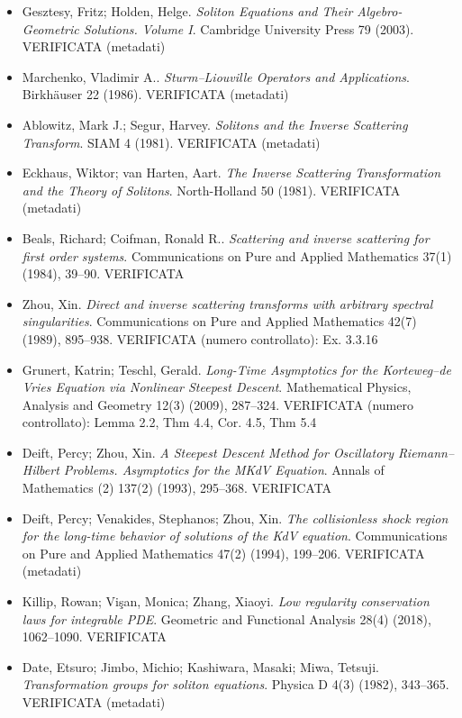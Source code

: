 \documentclass[11pt]{article}
\theoremstyle{plain}
\theoremstyle{definition}
\theoremstyle{remark}
\begin{document}
\begin{itemize}[itemsep=2pt,leftmargin=1.2em,font=\small]
\item Gesztesy, Fritz; Holden, Helge. \emph{Soliton Equations and Their Algebro-Geometric Solutions. Volume {I}}. Cambridge University Press 79 (2003). \textsf{\footnotesize VERIFICATA (metadati)}
\item Marchenko, Vladimir A.. \emph{Sturm--{L}iouville Operators and Applications}. Birkh{\"a}user 22 (1986). \textsf{\footnotesize VERIFICATA (metadati)}
\item Ablowitz, Mark J.; Segur, Harvey. \emph{Solitons and the Inverse Scattering Transform}. SIAM 4 (1981). \textsf{\footnotesize VERIFICATA (metadati)}
\item Eckhaus, Wiktor; van Harten, Aart. \emph{The Inverse Scattering Transformation and the Theory of Solitons}. North-Holland 50 (1981). \textsf{\footnotesize VERIFICATA (metadati)}
\item Beals, Richard; Coifman, Ronald R.. \emph{Scattering and inverse scattering for first order systems}. Communications on Pure and Applied Mathematics 37(1) (1984), 39--90. \textsf{\footnotesize VERIFICATA}
\item Zhou, Xin. \emph{Direct and inverse scattering transforms with arbitrary spectral singularities}. Communications on Pure and Applied Mathematics 42(7) (1989), 895--938. \textsf{\footnotesize VERIFICATA (numero controllato): Ex. 3.3.16}
\item Grunert, Katrin; Teschl, Gerald. \emph{Long-Time Asymptotics for the {K}orteweg--de {V}ries Equation via Nonlinear Steepest Descent}. Mathematical Physics, Analysis and Geometry 12(3) (2009), 287--324. \textsf{\footnotesize VERIFICATA (numero controllato): Lemma 2.2, Thm 4.4, Cor. 4.5, Thm 5.4}
\item Deift, Percy; Zhou, Xin. \emph{A Steepest Descent Method for Oscillatory {R}iemann--{H}ilbert Problems. {A}symptotics for the {MKdV} Equation}. Annals of Mathematics (2) 137(2) (1993), 295--368. \textsf{\footnotesize VERIFICATA}
\item Deift, Percy; Venakides, Stephanos; Zhou, Xin. \emph{The collisionless shock region for the long-time behavior of solutions of the {KdV} equation}. Communications on Pure and Applied Mathematics 47(2) (1994), 199--206. \textsf{\footnotesize VERIFICATA (metadati)}
\item Killip, Rowan; Vi{\c s}an, Monica; Zhang, Xiaoyi. \emph{Low regularity conservation laws for integrable {PDE}}. Geometric and Functional Analysis 28(4) (2018), 1062--1090. \textsf{\footnotesize VERIFICATA}
\item Date, Etsuro; Jimbo, Michio; Kashiwara, Masaki; Miwa, Tetsuji. \emph{Transformation groups for soliton equations}. Physica D 4(3) (1982), 343--365. \textsf{\footnotesize VERIFICATA (metadati)}

\end{itemize}
\end{document}
